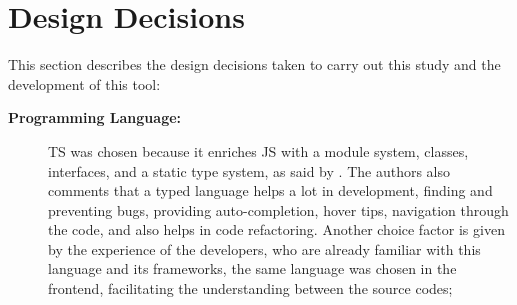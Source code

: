 \section{Design Decisions}\label{sec:ext-design}
This section describes the design decisions taken to carry out this study and the development of this tool:
\begin{description}
    
    \item[\textbf{Programming Language:}] \ac{TS} was chosen because it enriches \ac{JS} with a module system, classes, interfaces, and a static type system, as said by \textcite{Bierman_2014}.
    The authors also comments that a typed language helps a lot in development, finding and preventing bugs, providing auto-completion, hover tips, navigation through the code, and also helps in code refactoring.
    Another choice factor is given by the experience of the developers, who are already familiar with this language and its frameworks, the same language was chosen in the frontend, facilitating the understanding between the source codes;
    
    

\end{description}
